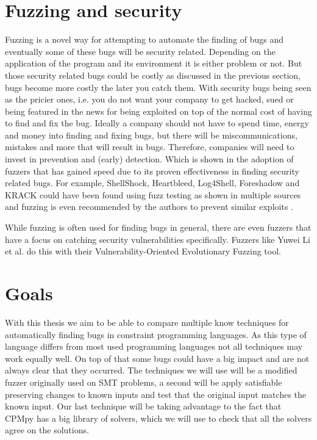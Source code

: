 \section{Fuzzing and security}
\label{intro:FussingSecurity}
Fuzzing is a novel way for attempting to automate the finding of bugs and eventually some of these bugs will be security related. Depending on the application of the program and its environment it is either problem or not. But those security related bugs could be costly as discussed in the previous section, bugs become more costly the later you 
catch them. With security bugs being seen as the pricier ones, i.e. you do not want your company to get hacked, sued or being featured in the news for being exploited on top of the normal cost of having to find and fix the bug. %
Ideally a company should not have to spend time, energy and money into finding and fixing bugs, but there will be miscommunications, mistakes and more that will result in bugs. Therefore, companies will need to invest in prevention and (early) detection. Which is shown in the adoption of fuzzers that has gained speed due to its proven effectiveness in finding security related bugs. For example, ShellShock, Heartbleed, Log4Shell, Foreshadow and KRACK could have been found using fuzz testing as shown in multiple sources \cite{HeartbleedViaFuzzing, 34ForeshadowViaFuzz, ShellShockViaFuzzing, Log4ShellViaFuzzing} and fuzzing is even recommended by the authors to prevent similar exploits \cite{35ForeshadowFuzzRecom, 33KrackViaFuzz}.

While fuzzing is often used for finding bugs in general, there are even fuzzers that have a focus on catching security vulnerabilities specifically. Fuzzers like Yuwei Li et al. \cite{32V-Fuzz} do this with their Vulnerability-Oriented Evolutionary Fuzzing tool.

\section{Goals}
\label{intro:Goals}
With this thesis we aim to be able to compare multiple know techniques for automatically finding bugs in constraint programming languages. As this type of language differs from most used programming languages not all techniques may work equally well. On top of that some bugs could have a big impact and are not always clear that they occurred.
The techniques we will use will be a modified fuzzer originally used on SMT problems, a second will be apply satisfiable preserving changes to known inputs and test that the original input matches the known input. Our last technique will be taking advantage to the fact that CPMpy has a big library of solvers, which we will use to check that all the solvers agree on the solutions.

